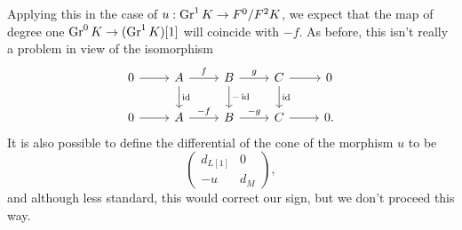 \documentclass[deligne.tex]{subfiles}
\begin{document}
Applying this in the case of $u:\operatorname{Gr}^1K\rightarrow F^0/F^2K$, we expect that the map
of degree one $\operatorname{Gr}^0K\rightarrow(\operatorname{Gr}^1K)[1]$ will coincide with $-f$.
As before, this isn't really a problem in view of the isomorphism
\begin{equation*}\begin{tikzcd}
	0\arrow[r]&A\arrow[r,"f"]\arrow[d,"\id"]
	&B\arrow[r,"g"]\arrow[d,"-\id"]
	&C\arrow[r]\arrow[d,"\id"]&0 \\
	0\arrow[r]&A\arrow[r,"-f"]&B\arrow[r,"-g"]&C\arrow[r]&0.
\end{tikzcd}\end{equation*}
It is also possible to define the differential of the
cone of the morphism $u$ to be
\begin{equation*}
	\begin{pmatrix}d_{L[1]}&0\\-u&d_M\end{pmatrix},
\end{equation*}
and although less standard, this would correct our sign, but we don't
proceed this way.
\end{document}
